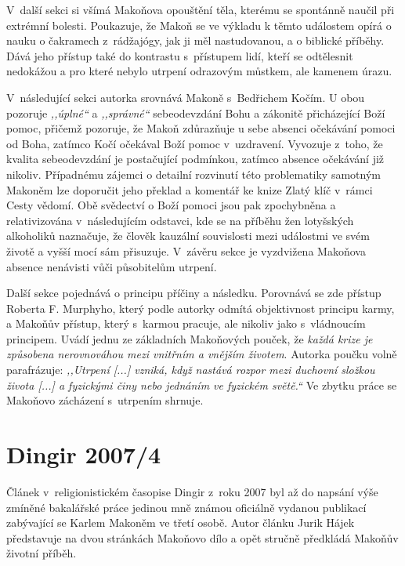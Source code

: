 V~další sekci si všímá Makoňova opouštění těla, kterému se spontánně
naučil při extrémní bolesti. Poukazuje, že Makoň se ve výkladu k těmto událostem
opírá o nauku o čakramech z~rádžajógy, jak ji měl nastudovanou, a o biblické
příběhy. Dává jeho přístup také do kontrastu s~přístupem lidí, kteří se
odtělesnit nedokážou a pro které nebylo utrpení odrazovým můstkem, ale kamenem úrazu.

V~následující sekci autorka srovnává Makoně s~Bedřichem Kočím. U obou pozoruje
\textit{,,úplné``} a \textit{,,správné``} sebeodevzdání Bohu a zákonitě
přicházející Boží pomoc, přičemž pozoruje, že Makoň zdůrazňuje u sebe absenci
očekávání pomoci od Boha, zatímco Kočí očekával Boží pomoc v~uzdravení. Vyvozuje
z~toho, že kvalita sebeodevzdání je postačující podmínkou, zatímco absence
očekávání již nikoliv. Případnému zájemci o detailní rozvinutí této problematiky
samotným Makoněm lze doporučit jeho překlad a komentář ke knize Zlatý
klíč\cite{fox1931golden} v~rámci Cesty vědomí.\cite{KaMaCV2} Obě
svědectví o Boží pomoci jsou pak zpochybněna a relativizována v~následujícím
odstavci, kde se na příběhu žen lotyšských alkoholiků naznačuje, že člověk
kauzální souvislosti mezi událostmi ve svém životě a vyšší mocí sám přisuzuje.
V~závěru sekce je vyzdvižena Makoňova absence nenávisti vůči působitelům
utrpení.

Další sekce pojednává o principu příčiny a následku. Porovnává se zde přístup
Roberta F. Murphyho,\cite{murphy2001body} který podle autorky odmítá objektivnost principu karmy, a
Makoňův přístup, který s~karmou pracuje, ale nikoliv jako s~vládnoucím
principem. Uvádí jednu ze základních Makoňových pouček, že \textit{každá krize
je způsobena nerovnováhou mezi vnitřním a vnějším životem}. Autorka poučku volně
parafrázuje: \textit{,,Utrpení [...] vzniká, když nastává rozpor mezi duchovní
složkou života [...] a fyzickými činy nebo jednáním ve fyzickém světě.``}
Ve zbytku práce se Makoňovo zácházení s~utrpením shrnuje.

\section{Dingir 2007/4}

Článek v~religionistickém časopise Dingir z~roku 2007\cite{hajek2007cesky} byl
až do napsání výše zmíněné bakalářské práce jedinou mně známou oficiálně vydanou
publikací zabývající se Karlem Makoněm ve třetí osobě. Autor článku Jurik Hájek
představuje na dvou stránkách Makoňovo dílo a opět stručně předkládá Makoňův
životní příběh.

